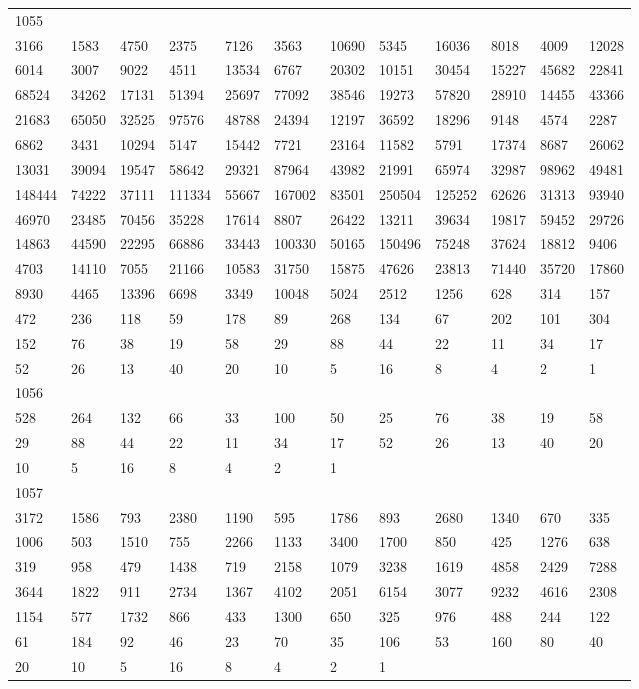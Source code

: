 \begin{longtable}{llllllllllll}
1055&&&&&&&&&&&\\
3166& 1583& 4750& 2375& 7126& 3563& 10690& 5345& 16036& 8018& 4009& 12028\\
6014& 3007& 9022& 4511& 13534& 6767& 20302& 10151& 30454& 15227& 45682& 22841\\
68524& 34262& 17131& 51394& 25697& 77092& 38546& 19273& 57820& 28910& 14455& 43366\\
21683& 65050& 32525& 97576& 48788& 24394& 12197& 36592& 18296& 9148& 4574& 2287\\
6862& 3431& 10294& 5147& 15442& 7721& 23164& 11582& 5791& 17374& 8687& 26062\\
13031& 39094& 19547& 58642& 29321& 87964& 43982& 21991& 65974& 32987& 98962& 49481\\
148444& 74222& 37111& 111334& 55667& 167002& 83501& 250504& 125252& 62626& 31313& 93940\\
46970& 23485& 70456& 35228& 17614& 8807& 26422& 13211& 39634& 19817& 59452& 29726\\
14863& 44590& 22295& 66886& 33443& 100330& 50165& 150496& 75248& 37624& 18812& 9406\\
4703& 14110& 7055& 21166& 10583& 31750& 15875& 47626& 23813& 71440& 35720& 17860\\
8930& 4465& 13396& 6698& 3349& 10048& 5024& 2512& 1256& 628& 314& 157\\
472& 236& 118& 59& 178& 89& 268& 134& 67& 202& 101& 304\\
152& 76& 38& 19& 58& 29& 88& 44& 22& 11& 34& 17\\
52& 26& 13& 40& 20& 10& 5& 16& 8& 4& 2& 1\\

1056&&&&&&&&&&&\\
528& 264& 132& 66& 33& 100& 50& 25& 76& 38& 19& 58\\
29& 88& 44& 22& 11& 34& 17& 52& 26& 13& 40& 20\\
10& 5& 16& 8& 4& 2& 1& \\

1057&&&&&&&&&&&\\
3172& 1586& 793& 2380& 1190& 595& 1786& 893& 2680& 1340& 670& 335\\
1006& 503& 1510& 755& 2266& 1133& 3400& 1700& 850& 425& 1276& 638\\
319& 958& 479& 1438& 719& 2158& 1079& 3238& 1619& 4858& 2429& 7288\\
3644& 1822& 911& 2734& 1367& 4102& 2051& 6154& 3077& 9232& 4616& 2308\\
1154& 577& 1732& 866& 433& 1300& 650& 325& 976& 488& 244& 122\\
61& 184& 92& 46& 23& 70& 35& 106& 53& 160& 80& 40\\
20& 10& 5& 16& 8& 4& 2& 1& \\


\end{longtable}
